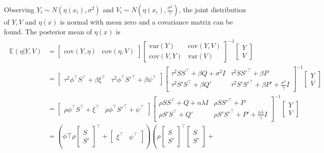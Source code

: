 Observing $Y_i\sim N(\eta(x_i),\sigma^2)$ and $V_i\sim N(\eta(x_i),\frac{\sigma^2}{\gamma})$, the joint distribution of $Y,V$ and $\eta(x)$ is normal with mean zero and a covariance matrix can be found. The posterior mean of $\eta(x)$ is 
\begin{align}\label{rhoeq}
\begin{split}
\mathbb{E}(\eta | Y,V)&=
\begin{bmatrix}
\mbox{cov}(Y,\eta) & \mbox{cov}(\eta,V)
\end{bmatrix}\begin{bmatrix}
\mbox{var}(Y) & \mbox{cov}(Y,V)\\
\mbox{cov}(V,Y) & \mbox{var}(V)
\end{bmatrix}^{-1}\begin{bmatrix}
Y\\V
\end{bmatrix}\\
&=
\begin{bmatrix}
\tau^2 \phi^\top S^\top+\beta \xi^\top & \tau^2  \phi^\top S'^\top+\beta \psi^\top 
\end{bmatrix}\begin{bmatrix}
\tau^2 SS^\top+\beta Q+\sigma^2 I& \tau^2 SS'^\top+\beta P\\
\tau^2 S'S^\top+\beta Q'& \tau^2 S'S'^\top+\beta P'+\frac{\sigma^2}{\gamma}I
\end{bmatrix}^{-1}\begin{bmatrix}
Y\\V
\end{bmatrix}\\
&=
\begin{bmatrix}
\rho\phi^\top S^\top+ \xi^\top & \rho\phi^\top S'^\top+\psi^\top
\end{bmatrix}\begin{bmatrix}
\rho SS^\top+Q+n\lambda I& \rho SS'^\top+P\\
\rho S'S^\top+Q'& \rho S'S'^\top+P'+\frac{n\lambda}{\gamma}I
\end{bmatrix}^{-1}\begin{bmatrix}
Y\\V
\end{bmatrix}\\
&=(\phi\top \rho 
\begin{bmatrix} S\\ S' \end{bmatrix}^\top + \begin{bmatrix} \xi^\top & \psi^\top\end{bmatrix})
\left(\rho\begin{bmatrix} S \\ S' \end{bmatrix}^\top \begin{bmatrix} S \\ S' \end{bmatrix}+

\end{split}
\end{align}
